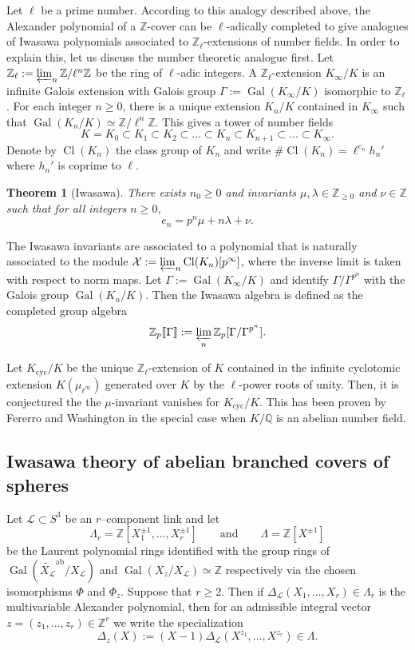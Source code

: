\documentclass[table]{amsart}
\newtheorem{theorem}{Theorem}[section]
\newcommand{\Z}{\mathbb{Z}}
\newcommand{\Q}{\mathbb{Q}}
\newcommand{\cL}{\mathcal{L}}
\newcommand{\op}[1]{\operatorname{#1}}
\numberwithin{equation}{section}
\begin{document}
\par Let $\ell$ be a prime number. According to this analogy described above, the Alexander polynomial of a $\Z$-cover can be $\ell$-adically completed to give analogues of Iwasawa polynomials associated to $\Z_\ell$-extensions of number fields. In order to explain this, let us discuss the number theoretic analogue first. Let $\Z_\ell:=\varprojlim_n \Z/\ell^n \Z$ be the ring of $\ell$-adic integers. A $\Z_\ell$-extension $K_\infty/K$ is an infinite Galois extension with Galois group $\Gamma:=\op{Gal}(K_\infty/K)$ isomorphic to $\Z_\ell$. For each integer $n\geq 0$, there is a unique extension $K_n/K$ contained in $K_\infty$ such that $\op{Gal}(K_n/K)\simeq \Z/\ell^n\Z$. This gives a tower of number fields
\[K=K_0\subset K_1\subset K_2\subset \dots \subset K_n\subset K_{n+1}\subset \dots \subset K_\infty.\]
\noindent Denote by $\op{Cl}(K_n)$ the class group of $K_n$ and write $\# \op{Cl}(K_n)=\ell^{e_n} h_n'$ where $h_n'$ is coprime to $\ell$.
\begin{theorem}[Iwasawa]
    There exists $n_0\geq 0$ and invariants $\mu, \lambda\in \Z_{\geq 0}$ and $\nu\in \Z$ such that for all integers $n\geq 0$, 
    \[e_n=p^n \mu+n \lambda+\nu.\]
\end{theorem}
\noindent The Iwasawa invariants are associated to a polynomial that is naturally associated to the module $\mathcal{X}:=\varprojlim_{n} \op{Cl}(K_n)[p^\infty]$, where the inverse limit is taken with respect to norm maps. Let $\Gamma:=\op{Gal}(K_\infty/K)$ and identify $\Gamma/\Gamma^{p^n}$ with the Galois group $\op{Gal}(K_n/K)$. Then the Iwasawa algebra is defined as the completed group algebra 
\[\Z_p\llbracket \Gamma\rrbracket:=\varprojlim_n \Z_p[\Gamma/\Gamma^{p^n}].\] 

\par Let $K_{\op{cyc}}/K$ be the unique $\Z_\ell$-extension of $K$ contained in the infinite cyclotomic extension $K(\mu_{\ell^\infty})$ generated over $K$ by the $\ell$-power roots of unity. Then, it is conjectured the the $\mu$-invariant vanishes for $K_{\op{cyc}}/K$. This has been proven by Fererro and Washington \cite{ferrerowash} in the special case when $K/\Q$ is an abelian number field. 
\subsection{Iwasawa theory of abelian branched covers of spheres}
Let $\cL\subset S^3$ be an $r$--component link and let
\[
\Lambda_r=\mathbb{Z}[X_1^{\pm1},\dots,X_r^{\pm1}]
\qquad\text{and}\qquad
\Lambda=\mathbb{Z}[X^{\pm1}]
\]
be the Laurent polynomial rings identified with the group rings of
$\operatorname{Gal}(\widetilde{X_\cL}^{\operatorname{ab}}/X_\cL)$ and
$\operatorname{Gal}(X_z/X_\cL)\simeq\mathbb{Z}$ respectively via the chosen
isomorphisms $\Phi$ and $\Phi_z$. Suppose that $r\geq 2$. Then if
\(\Delta_{\cL}(X_1,\dots,X_r)\in\Lambda_r\) is the multivariable Alexander
polynomial, then for an admissible integral vector
$z=(z_1,\dots,z_r)\in\mathbb{Z}^r$ we write the specialization
\[
\Delta_z(X):=(X-1)\Delta_{\cL}(X^{z_1},\dots,X^{z_r})\in\Lambda.
\]
\end{document}
